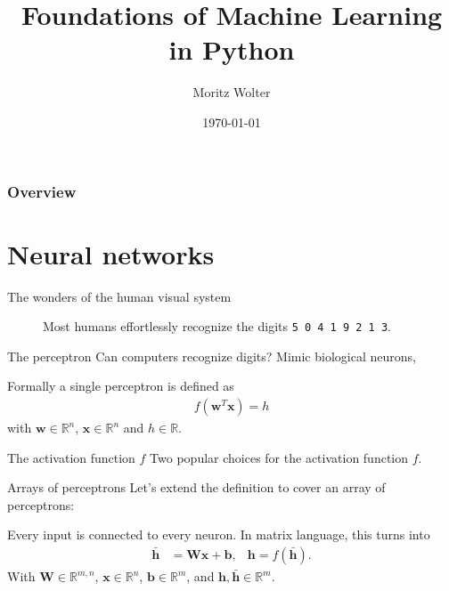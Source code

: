 \documentclass[notes]{beamer}
\title{Foundations of Machine Learning in Python}
\date{\today}
\institute{High-Performance Computing and Analytics Lab}
\author{Moritz Wolter}
\begin{document}
    \maketitle

    \begin{frame}
    \frametitle{Overview} 
    \tableofcontents
    \end{frame}

    \section{Neural networks}
    \begin{frame}{The wonders of the human visual system}
      \begin{figure}
        
        \caption{Most humans effortlessly recognize the digits \texttt{5 0 4 1 9 2 1 3}.}
      \end{figure}
    \end{frame}

    \begin{frame}{The perceptron}
      Can computers recognize digits? Mimic biological neurons,
      \begin{figure}
        
      \end{figure}
      Formally a single perceptron is defined as
      \begin{align}
        f(\mathbf{w}^T \mathbf{x}) = h
      \end{align}
      with $\mathbf{w} \in \mathbb{R}^n$, $\mathbf{x} \in \mathbb{R}^n$ and $h \in \mathbb{R}$. 
    \end{frame}

    \begin{frame}{The activation function $f$}
      Two popular choices for the activation function $f$.
      \begin{figure}
        
        
      \end{figure}
    \end{frame}

    \begin{frame}{Arrays of perceptrons}
      Let's extend the definition to cover an array of perceptrons:
      \begin{figure}
        
      \end{figure}
      Every input is connected to every neuron. In matrix language, this turns into
      \begin{align}
        \bar{\mathbf{h}} &= \mathbf{W}\mathbf{x} + \mathbf{b}, & \mathbf{h} = f(\bar{\mathbf{h}}).
      \end{align}
      With $\mathbf{W} \in \mathbb{R}^{m,n}$, $\mathbf{x} \in \mathbb{R}^{n}$, $\mathbf{b} \in \mathbb{R}^{m}$, and $\mathbf{h}, \bar{\mathbf{h}} \in \mathbb{R}^m$.
    \end{frame}
\end{document}
